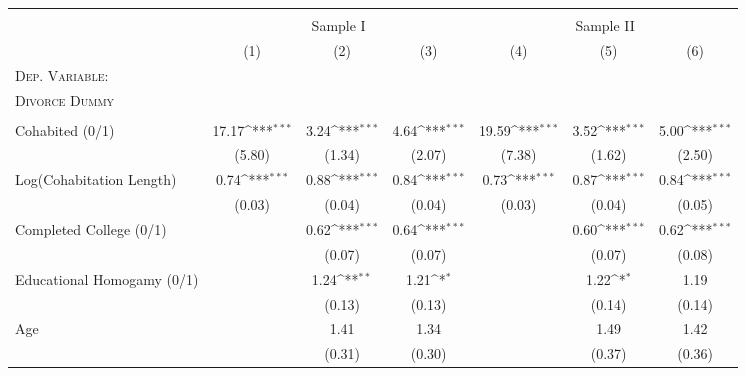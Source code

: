 {\def\sym#1{\ifmmode^{#1}\else\(^{#1}\)\fi}               \begin{tabular}{l*{6}{c}}                           \toprule
\\[-1.8ex] & \multicolumn{3}{c}{Sample I} & \multicolumn{3}{c}{Sample II} \\ 
\cmidrule(lr){2-4} \cmidrule(lr){5-7} 			
		
		              &\multicolumn{1}{c}{(1)}  &\multicolumn{1}{c}{(2)}  &\multicolumn{1}{c}{(3)}         &\multicolumn{1}{c}{(4)} &\multicolumn{1}{c}{(5)}  &\multicolumn{1}{c}{(6)}        \\              \midrule              \textsc{Dep. Variable:} & & & & & & \\ \textsc{Divorce Dummy} & & & & & & \\ & & & & & & \\
Cohabited (0/1) &    17.17\sym{***}&     3.24\sym{***}&     4.64\sym{***}&    19.59\sym{***}&     3.52\sym{***}&     5.00\sym{***}\\
                &   (5.80)         &   (1.34)         &   (2.07)         &   (7.38)         &   (1.62)         &   (2.50)         \\
Log(Cohabitation Length)&     0.74\sym{***}&     0.88\sym{***}&     0.84\sym{***}&     0.73\sym{***}&     0.87\sym{***}&     0.84\sym{***}\\
                &   (0.03)         &   (0.04)         &   (0.04)         &   (0.03)         &   (0.04)         &   (0.05)         \\
Completed College (0/1)&                  &     0.62\sym{***}&     0.64\sym{***}&                  &     0.60\sym{***}&     0.62\sym{***}\\
                &                  &   (0.07)         &   (0.07)         &                  &   (0.07)         &   (0.08)         \\
Educational Homogamy (0/1)&                  &     1.24\sym{**} &     1.21\sym{*}  &                  &     1.22\sym{*}  &     1.19         \\
                &                  &   (0.13)         &   (0.13)         &                  &   (0.14)         &   (0.14)         \\
Age             &                  &     1.41         &     1.34         &                  &     1.49         &     1.42         \\
                &                  &   (0.31)         &   (0.30)         &                  &   (0.37)         &   (0.36)         \\

\end{tabular}}

